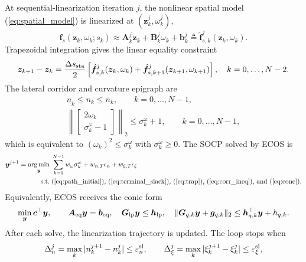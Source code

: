 \documentclass{iopjournal}
\DeclareMathOperator*{\argmin}{arg\,min}
\begin{document}
At sequential-linearization iteration $j$, the nonlinear spatial model
(\ref{eq:spatial_model}) is linearized at
$(\bm z_k^{j},\omega_k^{j})$,
\begin{equation}
\bm f_s(\bm z_k,\omega_k;s_k)
\approx
\bm A_k^j\bm z_k+\bm B_k^j\omega_k+\bm b_k^j
\triangleq \hat{\bm f}_{s,k}^j(\bm z_k,\omega_k).
\label{eq:path_affine_model}
\end{equation}
Trapezoidal integration gives the linear equality constraint
\begin{equation}
\bm z_{k+1}-\bm z_k
=\frac{\Delta s_{\rm sta}}{2}
\left[
\hat{\bm f}_{s,k}^{j}(\bm z_k,\omega_k)
+\hat{\bm f}_{s,k+1}^{j}(\bm z_{k+1},\omega_{k+1})
\right],
\quad k=0,\ldots,N-2 .
\label{eq:trap}
\end{equation}
The lateral corridor and curvature epigraph are
\begin{align}
\underline n_k\le n_k\le \overline n_k,\qquad k=0,\ldots,N-1,
\label{eq:corr_ineq}\\
\left\|
\begin{bmatrix}
2\omega_k\\ \sigma_k^\omega-1
\end{bmatrix}
\right\|_2
\le \sigma_k^\omega+1,\qquad k=0,\ldots,N-1,
\label{eq:cone}
\end{align}
which is equivalent to $(\omega_k)^2\le\sigma_k^\omega$ with
$\sigma_k^\omega\ge0$.  The SOCP solved by ECOS is
\begin{equation}
\begin{aligned}
\bm y^{j+1}=\argmin_{\bm y}\;&
\sum_{k=0}^{N-1} w_\omega \sigma_k^\omega
+w_{n,T}\epsilon_n+w_{\xi,T}\epsilon_\xi\\
\text{s.t.}\;&
\text{(\ref{eq:path_initial}), (\ref{eq:terminal_slack}),
(\ref{eq:trap}), (\ref{eq:corr_ineq}), and (\ref{eq:cone})}.
\end{aligned}
\label{eq:socp}
\end{equation}
Equivalently, ECOS receives the conic form
\begin{equation}
\min_{\bm y}\bm c^\top\bm y,\qquad
\bm A_{\rm eq}\bm y=\bm b_{\rm eq},\quad
\bm G_{\rm lp}\bm y\le\bm h_{\rm lp},\quad
\|\bm G_{q,k}\bm y+\bm g_{q,k}\|_2\le
\bm h_{q,k}^\top\bm y+h_{q,k}.
\label{eq:ecos_form}
\end{equation}
After each solve, the linearization trajectory is updated.  The loop stops
when
\begin{equation}
\Delta_n^j=\max_k|n_k^{j+1}-n_k^j|\le\varepsilon_n^{\rm sl},\qquad
\Delta_\xi^j=\max_k|\xi_k^{j+1}-\xi_k^j|\le\varepsilon_\xi^{\rm sl},
\label{eq:slin_conv}
\end{equation}
\end{document}
